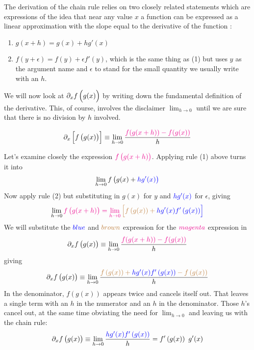 \documentclass[
  letterpaper,
  DIV=11,
  numbers=noendperiod,
  oneside]{scrreprt}
\providecommand{\tightlist}{%
  \setlength{\itemsep}{0pt}\setlength{\parskip}{0pt}}
\begin{document}
The derivation of the chain rule relies on two closely related
statements which are expressions of the idea that near any value \(x\) a
function can be expressed as a linear approximation with the slope equal
to the derivative of the function :

\begin{enumerate}
\def\labelenumi{\arabic{enumi}.}
\tightlist
\item
  \(g(x + h) = g(x) + h g'(x)\)
\item
  \(f(y + \epsilon) = f(y) + \epsilon f'(y)\), which is the same thing
  as (1) but uses \(y\) as the argument name and \(\epsilon\) to stand
  for the small quantity we usually write with an \(h\).
\end{enumerate}

We will now look at \(\partial_x f\left({\large\strut} g(x)\right)\) by
writing down the fundamental definition of the derivative. This, of
course, involves the disclaimer \(\lim_{h\rightarrow 0}\) until we are
sure that there is no division by \(h\) involved.

\[\partial_x \left[{\large\strut} f\left(\strut g(x)\right)\right]  \equiv \lim_{h\rightarrow 0}\frac{\color{magenta}{f(g(x+h))} - f(g(x))}{h}\]

Let's examine closely the expression
\(\color{magenta}{f\left(\strut g(x+h)\right)}\). Applying rule (1)
above turns it into
\[\lim_{h\rightarrow 0} f\left(\strut g(x) + \color{blue}{h g'(x)}\right)\]
Now apply rule (2) but substituting in \(g(x)\) for \(y\) and
\(\color{blue}{h g'(x)}\) for \(\epsilon\), giving\\
\[\lim_{h\rightarrow 0} \color{magenta}{f\left(\strut g(x+h)\right)} = \lim_{h\rightarrow 0} \color{brown}{\left[{\large\strut} f\left(g(x)\right) + \color{blue}{h g'(x)}f'\left(g(x)\right)\right]}\]
We will substitute the \(\color{blue}{blue}\) and
\(\color{brown}{brown}\) expression for the \(\color{magenta}{magenta}\)
expression in
\[\partial_x f\left(\strut g(x)\right)  \equiv \lim_{h\rightarrow 0}\frac{\color{magenta}{f(g(x+h))} - f(g(x))}{h}\]
giving
\[\partial_x f\left(\strut g(x)\right)  \equiv \lim_{h\rightarrow 0}\frac{\color{brown}{f\left(g(x)\right) + \color{blue}{h g'(x)}f'\left(g(x)\right)} - f\left(g(x)\right)}{h}\]
In the denominator, \(f\left(g(x)\right)\) appears twice and cancels
itself out. That leaves a single term with an \(h\) in the numerator and
an \(h\) in the denominator. Those \(h\)'s cancel out, at the same time
obviating the need for \(\lim_{h\rightarrow 0}\) and leaving us with the
chain rule:
\[\partial_x f\left(\strut g(x)\right)  \equiv \lim_{h\rightarrow 0}\frac{\color{brown}{ \color{blue}{h g'(x)} f'\left(g(x)\right)}}{h} = f'\left(g(x)\right)\ g'(x)\]
\end{document}
